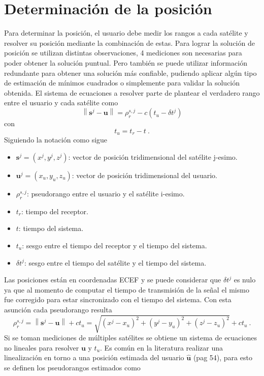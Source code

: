 \documentclass[a4paper,12pt,oneside,onecolumn,final,openright]{book}%
\begin{document}
\section{Determinación de la posición}
	Para determinar la posición, el usuario debe medir los rangos a cada satélite y resolver su posición mediante la combinación de estas. Para lograr la solución de posición se utilizan distintas observaciones, 4 mediciones son necesarias para poder obtener la solución puntual. Pero también se puede utilizar información redundante para obtener una solución más confiable, pudiendo aplicar algún tipo de estimación de mínimos cuadrados o simplemente para validar la solución obtenida. El sistema de ecuaciones a resolver parte de plantear el verdadero rango entre el usuario y cada satélite como 
\begin{equation}
	\left \lVert \mathbf{s}^j - \mathbf{u} \right \rVert = \rho_r^{s,j} - c(t_u-\delta t^j)
\end{equation}
	con 
\begin{equation}
	t_u = t_r - t \ .
\end{equation}
	Siguiendo la notación como sigue
\begin{itemize}
  \item[] $\mathbf{s}^j = (x^j,y^j,z^j)$: vector de posición tridimensional del satélite j-esimo.
  \item[] $\mathbf{u}^j = (x_u,y_u,z_u)$: vector de posición tridimensional del usuario.
  \item[] $\rho_r^{s,j}$: pseudorango entre el usuario y el satélite i-esimo.
  \item[] $t_r$: tiempo del receptor.
  \item[] $t$: tiempo del sistema.
  \item[] $t_u$: sesgo entre el tiempo del receptor y el tiempo del sistema.
  \item[] $\delta t^j$: sesgo entre el tiempo del satélite y el tiempo del sistema.
\end{itemize}
	Las posiciones están en coordenadas ECEF y se puede considerar que $\delta t^j$ es nulo ya que al momento de computar el tiempo de transmisión de la señal el mismo fue corregido para estar sincronizado con el tiempo del sistema. Con esta asunción cada pseudorango resulta
\begin{equation}
	\rho_r^{s,j} = \left \lVert \mathbf{s}^j - \mathbf{u} \right \rVert + ct_u = \sqrt{(x^j-x_u)^2+(y^j-y_u)^2+(z^j-z_u)^2} + ct_u \ .
\end{equation} 
	Si se toman mediciones de múltiples satélites se obtiene un sistema de ecuaciones no lineales para resolver $\mathbf{u}$ y $t_u$. Es común en la literatura realizar una linealización en torno a una posición estimada del usuario $\hat{\mathbf{u}}$ \cite{kaplan}(pag 54), para esto se definen los pseudorangos estimados como
\end{document}
